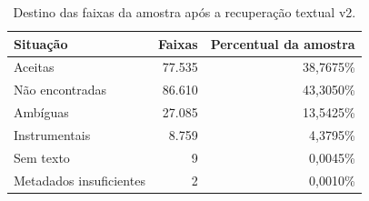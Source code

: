 \begin{table}[htbp]
\centering\small
\caption{Destino das faixas da amostra após a recuperação textual v2.}
\label{tab:cobertura}
\begin{tabular}{lrr}
\toprule
Situação & Faixas & Percentual da amostra \\
\midrule
Aceitas & 77.535 & 38,7675\% \\
Não encontradas & 86.610 & 43,3050\% \\
Ambíguas & 27.085 & 13,5425\% \\
Instrumentais & 8.759 & 4,3795\% \\
Sem texto & 9 & 0,0045\% \\
Metadados insuficientes & 2 & 0,0010\% \\
\bottomrule
\end{tabular}
\end{table}

